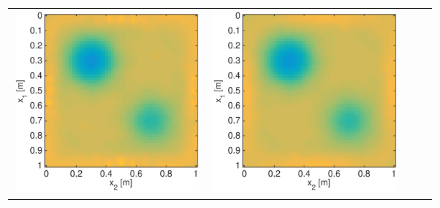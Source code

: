 \documentclass{iopart}
\begin{document}
\begin{figure}
\centering
\begin{tabular}{cccc}
\includegraphics[scale=.2]{./figs/2D_exp2_f}&
\includegraphics[scale=.2]{./figs/2D_exp2_g}&

\end{tabular}
\end{figure}
\end{document}

